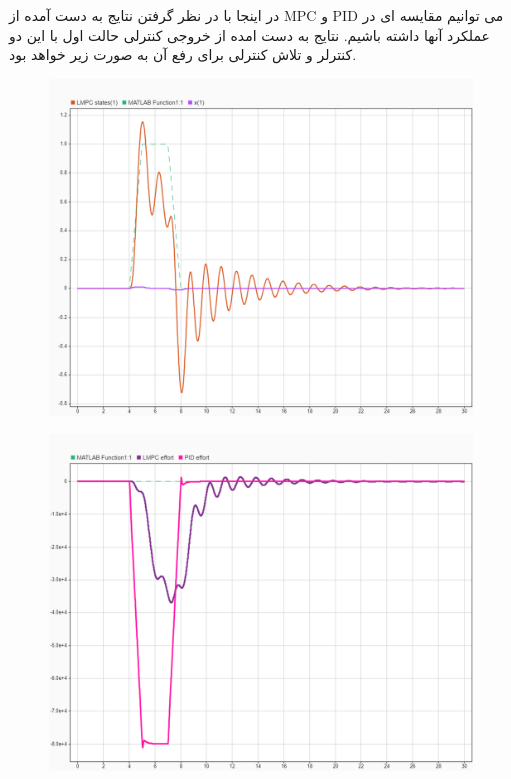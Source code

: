 در اینجا با در نظر گرفتن نتایج به دست آمده از MPC و PID می توانیم مقایسه ای در عملکرد آنها داشته باشیم.
نتایج به دست امده از خروجی کنترلی حالت اول با این دو کنترلر و تلاش کنترلی برای رفع آن به صورت زیر خواهد بود.

\begin{figure}[H]
	\centering
	\includegraphics[width=1\linewidth]{../img/13}
	\caption{}
	\label{fig:13}
\end{figure}

\begin{figure}[H]
	\centering
	\includegraphics[width=1\linewidth]{../img/14}
	\caption{}
	\label{fig:14}
\end{figure}

